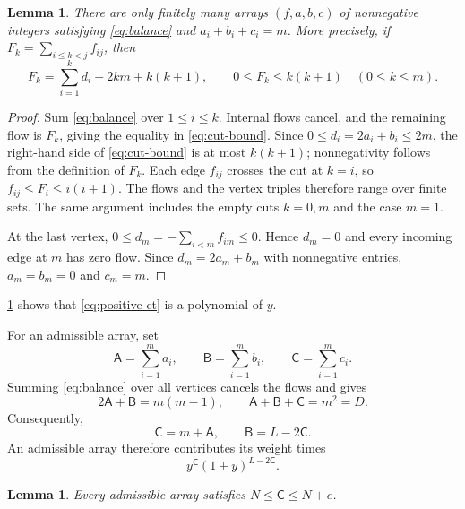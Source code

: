 \documentclass[reqno, 12pt]{article}
\numberwithin{equation}{section}
\newtheorem{lemma}[theorem]{Lemma}
\theoremstyle{definition}
\begin{document}
\begin{lemma}\label{lem:finite-gamma}
There are only finitely many arrays $(f,a,b,c)$ of nonnegative
integers satisfying \eqref{eq:balance} and
$a_i+b_i+c_i=m$.  More precisely, if
$F_k=\sum_{i\leq k<j}f_{ij}$, then
\begin{equation}\label{eq:cut-bound}
F_k=\sum_{i=1}^k d_i-2km+k(k+1),\qquad
0\leq F_k\leq k(k+1)\quad(0\leq k\leq m).
\end{equation}
\end{lemma}
\begin{proof}
Sum \eqref{eq:balance} over $1\leq i\leq k$.  Internal
flows cancel, and the remaining flow is $F_k$, giving the
equality in \eqref{eq:cut-bound}.  Since
$0\leq d_i=2a_i+b_i\leq2m$, the right-hand side of \eqref{eq:cut-bound} is at most
$k(k+1)$; nonnegativity follows from the definition of $F_k$.
Each edge $f_{ij}$ crosses the cut at $k=i$, so
$f_{ij}\leq F_i\leq i(i+1)$.  The flows and the vertex
triples therefore range over finite sets.  The same argument
includes the empty cuts $k=0,m$ and the case $m=1$.

At the last vertex,
$0\leq d_m=-\sum_{i<m}f_{im}\leq0$.  Hence $d_m=0$ and
every incoming edge at $m$ has zero flow.  Since
$d_m=2a_m+b_m$ with nonnegative entries, $a_m=b_m=0$ and
$c_m=m$.
\end{proof}

\cref{lem:finite-gamma} shows that \eqref{eq:positive-ct} is a polynomial of $y$. 


For an admissible array, set
\[
\mathsf A=\sum_{i=1}^{m} a_i,\qquad
\mathsf B=\sum_{i=1}^{m} b_i,\qquad
\mathsf C=\sum_{i=1}^{m} c_i.
\]
Summing \eqref{eq:balance} over all vertices cancels the flows
and gives
\begin{equation}\label{eq:global-sums}
2\mathsf A+\mathsf B=m(m-1),\qquad
\mathsf A+\mathsf B+\mathsf C=m^2=D.
\end{equation}
Consequently,
\begin{equation}\label{eq:gamma-sums}
\mathsf C=m+\mathsf A,
\qquad \mathsf B=L-2\mathsf C.
\end{equation}
An admissible array therefore contributes its weight times
\begin{equation}\label{eq:one-gamma-term}
y^{\mathsf C}(1+y)^{L-2\mathsf C}.
\end{equation}

\begin{lemma}\label{lem:range}
Every admissible array satisfies
$N\leq\mathsf C\leq N+e$.
\end{lemma}
\end{document}

